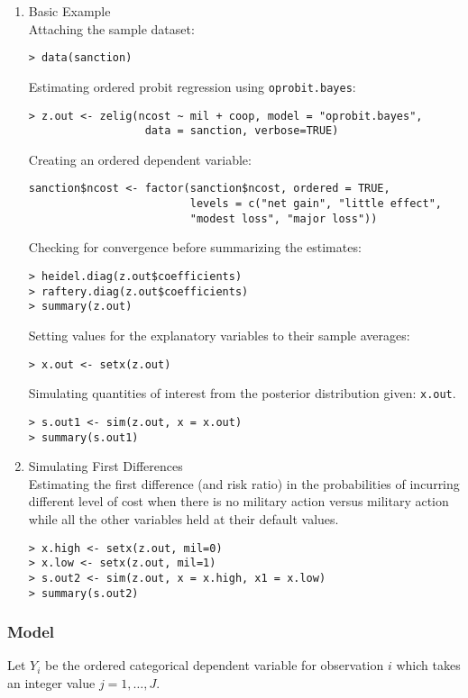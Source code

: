 \begin{enumerate}
\item {Basic Example} \\
Attaching the sample  dataset:
\begin{verbatim}
> data(sanction)
\end{verbatim}
Estimating ordered probit regression using \texttt{oprobit.bayes}:
\begin{verbatim}
> z.out <- zelig(ncost ~ mil + coop, model = "oprobit.bayes",
                  data = sanction, verbose=TRUE)
\end{verbatim}

Creating an ordered dependent variable:
\begin{verbatim}
sanction$ncost <- factor(sanction$ncost, ordered = TRUE,
                         levels = c("net gain", "little effect", 
                         "modest loss", "major loss"))
\end{verbatim}

Checking for convergence before summarizing the estimates:
\begin{verbatim}
> heidel.diag(z.out$coefficients)
> raftery.diag(z.out$coefficients)
> summary(z.out) 
\end{verbatim} %
Setting values for the explanatory variables to their sample averages:
\begin{verbatim}
> x.out <- setx(z.out)
\end{verbatim}
Simulating quantities of interest from the posterior distribution given:
\texttt{x.out}.
\begin{verbatim}
> s.out1 <- sim(z.out, x = x.out)
> summary(s.out1)
\end{verbatim}
\item {Simulating First Differences} \\
Estimating the first difference (and risk ratio) in the probabilities of
incurring different level of cost when there is no military action versus 
military action while all the other variables held at their 
default values.

\begin{verbatim}
> x.high <- setx(z.out, mil=0)
> x.low <- setx(z.out, mil=1)
> s.out2 <- sim(z.out, x = x.high, x1 = x.low)
> summary(s.out2)
\end{verbatim}
\end{enumerate}

\subsubsection{Model}
Let $Y_{i}$ be the ordered categorical dependent variable for
observation $i$ which takes an integer value $j=1, \ldots, J$.

